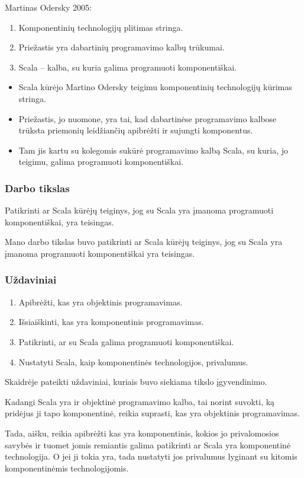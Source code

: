 \begin{frame}
  Martinas Odersky 2005:
  \begin{enumerate}
    \item Komponentinių technologijų plitimas stringa.
    \item Priežastis yra dabartinių programavimo kalbų trūkumai.
    \item Scala – kalba, su kuria galima programuoti komponentiškai.
  \end{enumerate}
  \begin{handout}
    \begin{itemize}
      \item Scala kūrėjo Martino Odersky teigimu komponentinių
        technologijų kūrimas stringa.
      \item Priežastis, jo nuomone, yra tai, kad dabartinėse
        programavimo kalbose trūksta priemonių leidžiančių
        apibrėžti ir sujungti komponentus.
      \item Tam jis kartu su kolegomis sukūrė programavimo kalbą
        Scala, su kuria, jo teigimu, galima programuoti komponentiškai.
    \end{itemize}
  \end{handout}
\end{frame}

\begin{frame}
  \frametitle{Darbo tikslas}
  Patikrinti ar Scala kūrėjų teiginys, jog su Scala yra įmanoma
  programuoti komponentiškai, yra teisingas.
  \begin{handout}
    Mano darbo tikslas buvo patikrinti ar Scala kūrėjų teiginys, jog
    su Scala yra įmanoma programuoti komponentiškai yra teisingas.
  \end{handout}
\end{frame}

\begin{frame}
  \frametitle{Uždaviniai}
  \begin{enumerate}
    \item Apibrėžti, kas yra objektinis programavimas.
    \item Išsiaiškinti, kas yra komponentinis programavimas.
    \item Patikrinti, ar su Scala galima programuoti komponentiškai.
    \item Nustatyti Scala, kaip komponentinės technologijos, privalumus.
  \end{enumerate}
  \begin{handout}
    Skaidrėje pateikti uždaviniai, kuriais buvo siekiama tikslo
    įgyvendinimo.

    Kadangi Scala yra ir objektinė programavimo kalba, tai
    norint suvokti, ką pridėjus ji tapo komponentinė, reikia
    suprasti, kas yra objektinis programavimas.

    Tada, aišku, reikia apibrėžti kas yra komponentinis, kokios jo
    privalomosios savybės ir tuomet jomis remiantis galima patikrinti
    ar Scala yra komponentinė technologija. O jei ji tokia yra,
    tada nustatyti jos privalumus lyginant su kitomis komponentinėmis
    technologijomis.
  \end{handout}
\end{frame}

